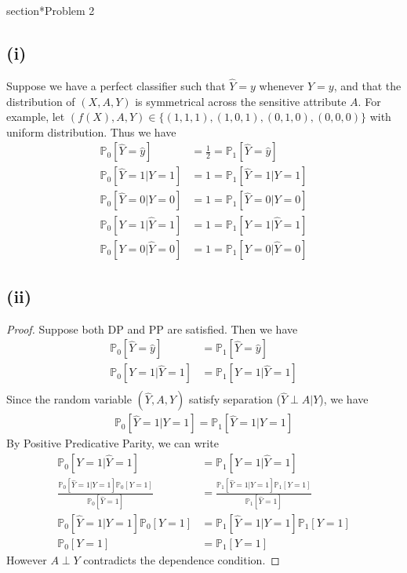 \documentclass[twoside,11pt]{homework}
\begin{document}
section*{Problem 2}
 \subsection*{(i)}
 	Suppose we have a perfect classifier such that $\hat{Y}=y$ whenever $Y=y$,
 	and that the distribution of $(X,A,Y)$ is symmetrical across the sensitive attribute $A$.
 	For example, let $(f(X),A,Y)\in \{(1,1,1),(1,0,1),(0,1,0),(0,0,0)\}$ with uniform distribution.
 	Thus we have
 	\begin{align*}
 		\mathbb{P}_0[\hat{Y}=\hat{y}] &= \frac{1}{2} = \mathbb{P}_1 [\hat{Y}=\hat{y}] \tag{DP}  \\
 		\mathbb{P}_0[\hat{Y}=1|Y=1] &= 1 = \mathbb{P}_1 [\hat{Y}=1|Y=1] \tag{True Positive EO} \\
 		\mathbb{P}_0[\hat{Y}=0|Y=0] &= 1 = \mathbb{P}_1 [\hat{Y}=0|Y=0] \tag{True Negative EO} \\
 		\mathbb{P}_0[Y=1 | \hat{Y}=1] &=1 = \mathbb{P}_1[Y=1 | \hat{Y}=1] \tag{Positive PP} \\
 		\mathbb{P}_0[Y=0 | \hat{Y}=0] &=1 = \mathbb{P}_1[Y=0 | \hat{Y}=0] \tag{Negative PP}
 	\end{align*}
 \subsection*{(ii)}
 	\begin{proof}
 		Suppose both DP and PP are satisfied.
 		Then we have
 		\begin{align*}
 			\mathbb{P}_0[\hat{Y}=\hat{y}] &= \mathbb{P}_1 [\hat{Y}=\hat{y}] \tag{DP} \\
 			\mathbb{P}_0[Y=1 | \hat{Y}=1] &= \mathbb{P}_1[Y=1 | \hat{Y}=1] \tag{Positive PP} \\
 		\end{align*}
 		Since the random variable $(\hat{Y},A,Y)$ satisfy separation ($\hat{Y}\perp A|Y$), we have
 		\begin{align*}
 			\mathbb{P}_0[\hat{Y}=1|Y=1] = \mathbb{P}_1[\hat{Y}=1|Y=1]
 		\end{align*}
 		By Positive Predicative Parity, we can write
 		\begin{align*}
 			\mathbb{P}_0[Y=1 | \hat{Y}=1] &= \mathbb{P}_1[Y=1 | \hat{Y}=1] \\
 			\frac{\mathbb{P}_0[\hat{Y}=1|Y=1] \mathbb{P}_0[Y=1] }{\mathbb{P}_0[\hat{Y}=1] }
 			&= \frac{\mathbb{P}_1[\hat{Y}=1|Y=1] \mathbb{P}_1[Y=1] }{ \mathbb{P}_1[\hat{Y}=1] } \tag{Bayes Rule} \\
 			\mathbb{P}_0[\hat{Y}=1|Y=1] \mathbb{P}_0[Y=1] &= \mathbb{P}_1[\hat{Y}=1|Y=1] \mathbb{P}_1[Y=1] \tag{DP}\\
 			\mathbb{P}_0[Y=1] &= \mathbb{P}_1[Y=1] \tag{Separation Condition}
 		\end{align*}
 		However $A\perp Y$ contradicts the dependence condition.
 	\end{proof}
\end{document}
